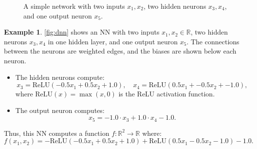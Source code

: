 \documentclass[oneside,11pt,dvipsnames]{book}
\numberwithin{equation}{section}
\theoremstyle{definition}
\newtheorem{example}{Example}[section]
\theoremstyle{remark}
\newcommand{\relu}[1]{\mathrm{ReLU}\left(#1\right)}
\begin{document}
\newcommand{\mydnntwo}[1]{
\begin{tikzpicture}[scale=#1, transform shape, semithick, ->]
    \node[input] (x1) at (0,1)  {$x_1$};
    \node[input] (x2) at (0,-1) {$x_2$};

    \node[hidden] (x3) at (2.8,1) {$x_3$};
    \node[hidden] (x4) at (2.8,-1) {$x_4$};

    \node[output] (x5) at (5,1) {$x_5$};
    \node[output] (x6) at (5,-1) {$x_6$};

    \draw (x1) -- (x3) node[midway, above] {$-0.7$} ;
    \draw (x1) -- (x4) node[near end, below] {$1.2$} ;
    \draw (x2) -- (x3) node[near end, above] {$0.3$} ;
    \draw (x2) -- (x4) node[midway, below] {$-0.5$} ;
    \draw (x3) -- (x5) node[midway, above] {$-2.0$};
    \draw (x4) -- (x5) node[near end, above] {$3.0$};
    \draw (x3) -- (x6) node[near end, below] {$-1.8$};
    \draw (x4) -- (x6) node[midway, below] {$0.7$};

    \node[above] at (x3.north) {$.8$};
    \node[below] at (x4.south) {$-2.0$};
    \node[above] at (x5.north) {$-1.2$};
    \node[below] at (x6.south) {$-.3$};
\end{tikzpicture}
}

\begin{figure}
    \centering
    \caption{\label{fig:dnn}A simple network with two inputs $x_1,x_2$, two hidden neurons $x_3,x_4$, and one output neuron $x_5$.}
\end{figure}

\begin{example}\label{ex:dnn}
\autoref{fig:dnn} shows an NN with two inputs $x_1, x_2 \in \mathbb{R}$, two hidden neurons \(x_3, x_4\) in one hidden layer, and one output neuron \(x_5\). The connections between the neurons are weighted edges, and the biases are shown below each neuron.


\begin{itemize}
    \item The hidden neurons compute:
    \[
    x_3 = \relu{-0.5 x_1 + 0.5 x_2 + 1.0},\quad x_4 = \relu{0.5 x_1 + -0.5 x_2 + -1.0},
    \]
    where $\relu{x} = \max(x, 0)$ is the ReLU activation function.
    \item The output neuron computes:
    \[
    x_5 = -1.0 \cdot x_3 + 1.0 \cdot x_4 - 1.0.
    \]
\end{itemize}

Thus, this NN computes a function \(f: \mathbb{R}^2 \to \mathbb{R}\) where:
\[
f(x_1, x_2) = -\relu{-0.5 x_1 + 0.5 x_2 + 1.0} + \relu{0.5x_1 -0.5 x_2 - 1.0} - 1.0.
\]
\end{example}
\end{document}

